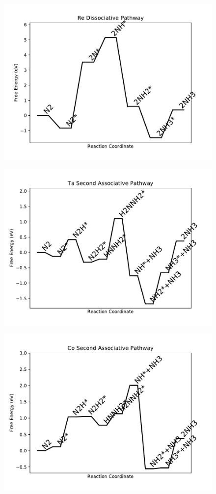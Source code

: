 \begin{figure}
\centering
\includegraphics[width=0.8\linewidth]{data/plots/Re_dissociative.pdf}
\end{figure}

\begin{figure}
\centering
\includegraphics[width=0.8\linewidth]{data/plots/Ta_associative_2.pdf}
\end{figure}

\begin{figure}
\centering
\includegraphics[width=0.8\linewidth]{data/plots/Co_associative_2.pdf}
\end{figure}

